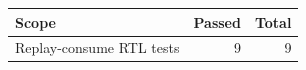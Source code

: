 \begin{tabular}{lrr}
\toprule
Scope & Passed & Total \\
\midrule
Replay-consume RTL tests & 9 & 9 \\
\bottomrule
\end{tabular}
